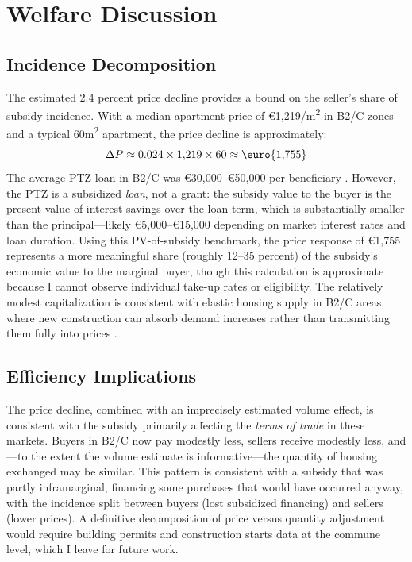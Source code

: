 \documentclass[12pt]{article}
\begin{document}
\section{Welfare Discussion}

\subsection{Incidence Decomposition}

The estimated 2.4 percent price decline provides a bound on the seller's share of subsidy incidence. With a median apartment price of \euro{1,219}/m\textsuperscript{2} in B2/C zones and a typical 60m\textsuperscript{2} apartment, the price decline is approximately:
$$\Delta P \approx 0.024 \times 1{,}219 \times 60 \approx \text{\euro{1,755}}$$
The average PTZ loan in B2/C was \euro{30,000}--\euro{50,000} per beneficiary \citep{cdc2020}. However, the PTZ is a subsidized \textit{loan}, not a grant: the subsidy value to the buyer is the present value of interest savings over the loan term, which is substantially smaller than the principal---likely \euro{5,000}--\euro{15,000} depending on market interest rates and loan duration. Using this PV-of-subsidy benchmark, the price response of \euro{1,755} represents a more meaningful share (roughly 12--35 percent) of the subsidy's economic value to the marginal buyer, though this calculation is approximate because I cannot observe individual take-up rates or eligibility. The relatively modest capitalization is consistent with elastic housing supply in B2/C areas, where new construction can absorb demand increases rather than transmitting them fully into prices \citep{saiz2010}.

\subsection{Efficiency Implications}

The price decline, combined with an imprecisely estimated volume effect, is consistent with the subsidy primarily affecting the \textit{terms of trade} in these markets. Buyers in B2/C now pay modestly less, sellers receive modestly less, and---to the extent the volume estimate is informative---the quantity of housing exchanged may be similar. This pattern is consistent with a subsidy that was partly inframarginal, financing some purchases that would have occurred anyway, with the incidence split between buyers (lost subsidized financing) and sellers (lower prices). A definitive decomposition of price versus quantity adjustment would require building permits and construction starts data at the commune level, which I leave for future work.
\end{document}
